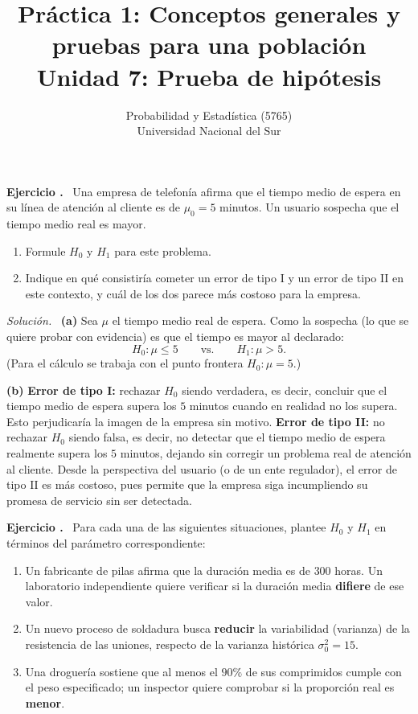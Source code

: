 \documentclass[11pt,a4paper]{article}
\title{Práctica 1: Conceptos generales y pruebas para una población \\ \large Unidad 7: Prueba de hipótesis}
\author{Probabilidad y Estadística (5765) \\ Universidad Nacional del Sur}
\date{}
\newcounter{ejnum}
\newenvironment{ejercicio}{\refstepcounter{ejnum}\par\medskip\noindent\textbf{Ejercicio \theejnum.}~}{\par}
\newenvironment{solucion}{\par\noindent\textit{Solución.}~}{\par\vspace{1em}}
\begin{document}
\maketitle

\begin{ejercicio}
Una empresa de telefonía afirma que el tiempo medio de espera en su línea de atención al cliente es de $\mu_0=5$ minutos. Un usuario sospecha que el tiempo medio real es mayor.
\begin{enumerate}[label=(\alph*)]
\item Formule $H_0$ y $H_1$ para este problema.
\item Indique en qué consistiría cometer un error de tipo I y un error de tipo II en este contexto, y cuál de los dos parece más costoso para la empresa.
\end{enumerate}
\end{ejercicio}

\begin{solucion}
\textbf{(a)} Sea $\mu$ el tiempo medio real de espera. Como la sospecha (lo que se quiere probar con evidencia) es que el tiempo es mayor al declarado:
\[
H_0:\mu\le5 \qquad \text{vs.} \qquad H_1:\mu>5.
\]
(Para el cálculo se trabaja con el punto frontera $H_0:\mu=5$.)

\textbf{(b)} \textbf{Error de tipo I:} rechazar $H_0$ siendo verdadera, es decir, concluir que el tiempo medio de espera supera los $5$ minutos cuando en realidad no los supera. Esto perjudicaría la imagen de la empresa sin motivo. \textbf{Error de tipo II:} no rechazar $H_0$ siendo falsa, es decir, no detectar que el tiempo medio de espera realmente supera los $5$ minutos, dejando sin corregir un problema real de atención al cliente. Desde la perspectiva del usuario (o de un ente regulador), el error de tipo II es más costoso, pues permite que la empresa siga incumpliendo su promesa de servicio sin ser detectada.
\end{solucion}

\begin{ejercicio}
Para cada una de las siguientes situaciones, plantee $H_0$ y $H_1$ en términos del parámetro correspondiente:
\begin{enumerate}[label=(\alph*)]
\item Un fabricante de pilas afirma que la duración media es de $300$ horas. Un laboratorio independiente quiere verificar si la duración media \textbf{difiere} de ese valor.
\item Un nuevo proceso de soldadura busca \textbf{reducir} la variabilidad (varianza) de la resistencia de las uniones, respecto de la varianza histórica $\sigma_0^2=15$.
\item Una droguería sostiene que al menos el $90\%$ de sus comprimidos cumple con el peso especificado; un inspector quiere comprobar si la proporción real es \textbf{menor}.
\end{enumerate}
\end{ejercicio}
\end{document}
